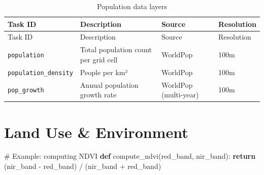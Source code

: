\documentclass[
  letterpaper,
  DIV=11,
  numbers=noendperiod]{scrreprt}
\newenvironment{Shaded}{\begin{snugshade}}{\end{snugshade}}
\newcommand{\CommentTok}[1]{\textcolor[rgb]{0.37,0.37,0.37}{#1}}
\newcommand{\ControlFlowTok}[1]{\textcolor[rgb]{0.00,0.23,0.31}{\textbf{#1}}}
\newcommand{\KeywordTok}[1]{\textcolor[rgb]{0.00,0.23,0.31}{\textbf{#1}}}
\newcommand{\NormalTok}[1]{\textcolor[rgb]{0.00,0.23,0.31}{#1}}
\newcommand{\OperatorTok}[1]{\textcolor[rgb]{0.37,0.37,0.37}{#1}}
\begin{document}
\begin{longtable}[]{@{}
  >{\raggedright\arraybackslash}p{}
  >{\raggedright\arraybackslash}p{}
  >{\raggedright\arraybackslash}p{}
  >{\raggedright\arraybackslash}p{}@{}}
\caption{Population data layers}\label{tbl-population}\tabularnewline
\toprule\noalign{}
\begin{minipage}[b]{\linewidth}\raggedright
Task ID
\end{minipage} & \begin{minipage}[b]{\linewidth}\raggedright
Description
\end{minipage} & \begin{minipage}[b]{\linewidth}\raggedright
Source
\end{minipage} & \begin{minipage}[b]{\linewidth}\raggedright
Resolution
\end{minipage} \\
\midrule\noalign{}
\endfirsthead
\toprule\noalign{}
\begin{minipage}[b]{\linewidth}\raggedright
Task ID
\end{minipage} & \begin{minipage}[b]{\linewidth}\raggedright
Description
\end{minipage} & \begin{minipage}[b]{\linewidth}\raggedright
Source
\end{minipage} & \begin{minipage}[b]{\linewidth}\raggedright
Resolution
\end{minipage} \\
\midrule\noalign{}
\endhead
\bottomrule\noalign{}
\endlastfoot
\texttt{population} & Total population count per grid cell & WorldPop &
100m \\
\texttt{population\_density} & People per km² & WorldPop & 100m \\
\texttt{pop\_growth} & Annual population growth rate & WorldPop
(multi-year) & 100m \\
\end{longtable}

\section{Land Use \& Environment}\label{land-use-environment}

\begin{Shaded}
\begin{Highlighting}[]
\CommentTok{\# Example: computing NDVI}
\KeywordTok{def}\NormalTok{ compute\_ndvi(red\_band, nir\_band):}
    \ControlFlowTok{return}\NormalTok{ (nir\_band }\OperatorTok{{-}}\NormalTok{ red\_band) }\OperatorTok{/}\NormalTok{ (nir\_band }\OperatorTok{+}\NormalTok{ red\_band)}
\end{Highlighting}
\end{Shaded}
\end{document}
